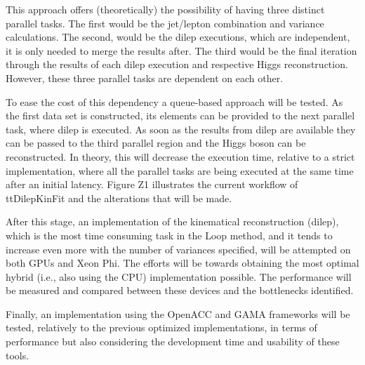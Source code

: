 This approach offers (theoretically) the possibility of having three distinct parallel tasks. The first would be the jet/lepton combination and variance calculations. The second, would be the dilep executions, which are independent, it is only needed to merge the results after. The third would be the final iteration through the results of each dilep execution and respective Higgs reconstruction. However, these three parallel tasks are dependent on each other. 

To ease the cost of this dependency a queue-based approach will be tested. As the first data set is constructed, its elements can be provided to the next parallel task, where dilep is executed. As soon as the results from dilep are available they can be passed to the third parallel region and the Higgs boson can be reconstructed. In theory, this will decrease the execution time, relative to a strict implementation, where all the parallel tasks are being executed at the same time after an initial latency. Figure Z1 illustrates the current workflow of ttDilepKinFit and the alterations that will be made.

After this stage, an implementation of the kinematical reconstruction (dilep), which is the most time consuming task in the Loop method, and it tends to increase even more with the number of variances specified, will be attempted on both GPUs and Xeon Phi. The efforts will be towards obtaining the most optimal hybrid (i.e., also using the CPU) implementation possible. The performance will be measured and compared between these devices and the bottlenecks identified.

Finally, an implementation using the OpenACC and GAMA frameworks will be tested, relatively to the previous optimized implementations, in terms of performance but also considering the development time and usability of these tools.

\newpage
